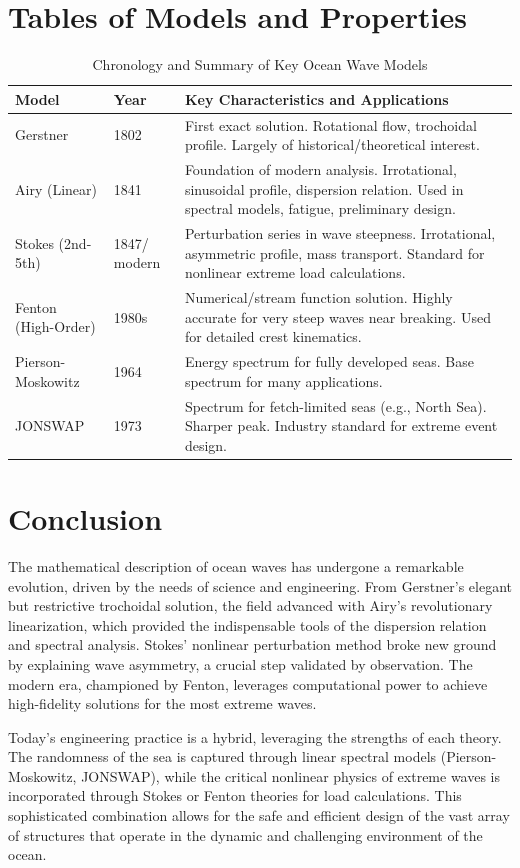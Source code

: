 \documentclass[11pt,letterpaper]{article}
\begin{document}
    \section{Tables of Models and Properties}
    \begin{table}[H]
        \centering
        \caption{Chronology and Summary of Key Ocean Wave Models}
        \begin{tabular}{@{}llL{6cm}@{}}
            \toprule
            Model & Year & Key Characteristics and Applications \\
            \midrule
            Gerstner & 1802 & First exact solution. Rotational flow, trochoidal profile. Largely of historical/theoretical interest. \\
            Airy (Linear) & 1841 & Foundation of modern analysis. Irrotational, sinusoidal profile, dispersion relation. Used in spectral models, fatigue, preliminary design. \\
            Stokes (2nd-5th) & 1847/ modern & Perturbation series in wave steepness. Irrotational, asymmetric profile, mass transport. Standard for nonlinear extreme load calculations. \\
            Fenton (High-Order) & 1980s & Numerical/stream function solution. Highly accurate for very steep waves near breaking. Used for detailed crest kinematics. \\
            Pierson-Moskowitz & 1964 & Energy spectrum for fully developed seas. Base spectrum for many applications. \\
            JONSWAP & 1973 & Spectrum for fetch-limited seas (e.g., North Sea). Sharper peak. Industry standard for extreme event design. \\
            \bottomrule
        \end{tabular}
    \end{table}

    \section{Conclusion}
    The mathematical description of ocean waves has undergone a remarkable evolution, driven by the needs of science and engineering. From Gerstner's elegant but restrictive trochoidal solution, the field advanced with Airy's revolutionary linearization, which provided the indispensable tools of the dispersion relation and spectral analysis. Stokes' nonlinear perturbation method broke new ground by explaining wave asymmetry, a crucial step validated by observation. The modern era, championed by Fenton, leverages computational power to achieve high-fidelity solutions for the most extreme waves.

    Today's engineering practice is a hybrid, leveraging the strengths of each theory. The randomness of the sea is captured through linear spectral models (Pierson-Moskowitz, JONSWAP), while the critical nonlinear physics of extreme waves is incorporated through Stokes or Fenton theories for load calculations. This sophisticated combination allows for the safe and efficient design of the vast array of structures that operate in the dynamic and challenging environment of the ocean.
\end{document}
